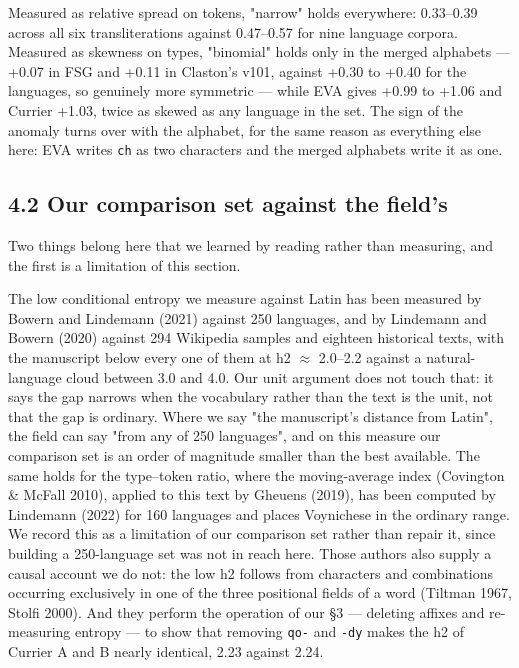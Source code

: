 \documentclass[11pt,a4paper]{article}
\begin{document}
Measured as relative spread on tokens, "narrow" holds everywhere: 0.33--0.39 across all six transliterations against 0.47--0.57 for nine language corpora. Measured as skewness on types, "binomial" holds only in the merged alphabets --- +0.07 in FSG and +0.11 in Claston's v101, against +0.30 to +0.40 for the languages, so genuinely more symmetric --- while EVA gives +0.99 to +1.06 and Currier +1.03, twice as skewed as any language in the set. The sign of the anomaly turns over with the alphabet, for the same reason as everything else here: EVA writes \texttt{ch} as two characters and the merged alphabets write it as one.


\subsection*{4.2 Our comparison set against the field's}


Two things belong here that we learned by reading rather than measuring, and the first is a limitation of this section.


The low conditional entropy we measure against Latin has been measured by Bowern and Lindemann (2021) against 250 languages, and by Lindemann and Bowern (2020) against 294 Wikipedia samples and eighteen historical texts, with the manuscript below every one of them at h2 $\approx$ 2.0--2.2 against a natural-language cloud between 3.0 and 4.0. Our unit argument does not touch that: it says the gap narrows when the vocabulary rather than the text is the unit, not that the gap is ordinary. Where we say "the manuscript's distance from Latin", the field can say "from any of 250 languages", and on this measure our comparison set is an order of magnitude smaller than the best available. The same holds for the type--token ratio, where the moving-average index (Covington \& McFall 2010), applied to this text by Gheuens (2019), has been computed by Lindemann (2022) for 160 languages and places Voynichese in the ordinary range. We record this as a limitation of our comparison set rather than repair it, since building a 250-language set was not in reach here. Those authors also supply a causal account we do not: the low h2 follows from characters and combinations occurring exclusively in one of the three positional fields of a word (Tiltman 1967, Stolfi 2000). And they perform the operation of our \S3 --- deleting affixes and re-measuring entropy --- to show that removing \texttt{qo-} and \texttt{-dy} makes the h2 of Currier A and B nearly identical, 2.23 against 2.24.
\end{document}
